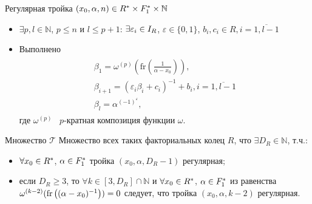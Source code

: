 \documentclass[8pt, xcolor=x11names]{beamer}
\begin{document}
\begin{frame}
    \begin{block}{Регулярная тройка $(x_{0},\alpha,n) \in R^{*} \times F_1^{*} \times \mathbb{N}$}
        \begin{itemize}
            \item $\exists p, l \in \mathbb{N}$, $p\le n$ и $l\le p+1$: $\exists \varepsilon_{i} \in I_{R}$, $\varepsilon \in \{0,1\}$, $b_{i}, c_{i} \in R, i = \overline{1,l-1}$
            
            \item Выполнено
            \begin{eqnarray*}
                \begin{array}{c}
                    \beta_{1}=\omega^{(p)}\left(\textrm{fr}\left(\frac{1}{\alpha-x_{0}}\right)\right),\\
                    \beta_{i+1}=(\varepsilon_{i}\beta_{i}+c_{i})^{-1}+b_{i}, i=\overline{1,l-1}\\
                    \beta_{l}=\alpha^{(-1)^{\varepsilon}},
                \end{array}
            \end{eqnarray*}
            где $\omega^{(p)}$ \textendash\ $p$-кратная композиция функции $\omega$.
        \end{itemize}
    \end{block}

    \begin{block}{Множество $\mathcal{T}$}
        Множество всех таких факториальных колец $R$, что $\exists D_R \in \mathbb{N}$, т.ч.:
        \begin{itemize}
            \item $\forall x_0 \in R^{*}$, $\alpha \in F_1^{*}$ тройка $(x_0, \alpha, D_R - 1)$ регулярная;
    
            \item если $D_R \ge 3$, то $\forall k \in [3, D_R] \cap \mathbb{N}$ и $\forall x_0 \in R^{*}$, $\alpha \in F_1^{*}$ из равенства $\omega^{(k-2)}(\textrm{fr}\left((\alpha - x_0)^{-1}\right)) = 0$ следует, что тройка $(x_0, \alpha, k-2)$ регулярная.
        \end{itemize}
    \end{block}
\end{frame}
\end{document}
